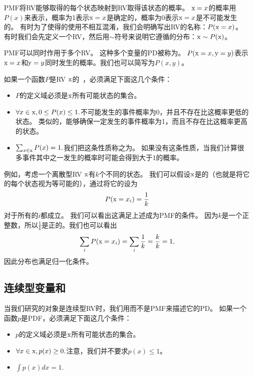 
\gls{PMF}将\gls{RV}能够取得的每个状态映射到\gls{RV}取得该状态的概率。
$\mathrm{x} = x$的概率用$P(x)$来表示，概率为1表示$\mathrm{x} = x$是确定的，概率为0表示$\mathrm{x}=x$是不可能发生的。
有时为了使得的使用不相互混淆，我们会明确写出\gls{RV}的名称：$P(\mathrm{x} = x)$。
有时我们会先定义一个\gls{RV}，然后用$\sim$符号来说明它遵循的分布：$\mathrm{x}\sim P(\mathrm{x})$。

\gls{PMF}可以同时作用于多个\gls{RV}。
这种多个变量的\gls{PD}被称为。
$P(\mathrm{x} = x, \mathrm{y} = y)$表示$\mathrm{x} = x$和$\mathrm{y} = y$同时发生的概率。我们也可以简写为$P(x, y)$。

如果一个函数$P$是\gls{RV} $\mathrm{x}$的~，必须满足下面这几个条件：
\begin{itemize}
\item $P$的定义域必须是$\mathrm{x}$所有可能状态的集合。

\item $\forall x \in \mathrm{x}, 0\le P(x)\le 1.$不可能发生的事件概率为0，并且不存在比这概率更低的状态。
类似的，能够确保一定发生的事件概率为1，而且不存在比这概率更高的状态。

\item $\sum_{x \in \mathrm{x}} P(x) = 1.$我们把这条性质称之为。
如果没有这条性质，当我们计算很多事件其中之一发生的概率时可能会得到大于1的概率。
\end{itemize}

例如，考虑一个离散型\gls{RV} $\mathrm{x}$有$k$个不同的状态。
我们可以假设$\mathrm{x}$是的（也就是将它的每个状态视为等可能的），通过将它的设为
\begin{equation}
P(\mathrm{x} = x_i) = \frac{1}{k}
\end{equation}
对于所有的$i$都成立。
我们可以看出这满足上述成为\gls{PMF}的条件。
因为$k$是一个正整数，所以$\frac{1}{k}$是正的。我们也可以看出
\begin{equation}
\sum_i P(\mathrm{x} = x_i) = \sum_i \frac{1}{k} = \frac{k}{k} = 1,
\end{equation}
因此分布也满足归一化条件。


\subsection{连续型变量和}
\label{sec:continuous_variables_and_probability_density_functions}

当我们研究的对象是连续型\gls{RV}时，我们用而不是\gls{PMF}来描述它的\gls{PD}。
如果一个函数$p$是\gls{PDF}，必须满足下面这几个条件：
\begin{itemize}
\item $p$的定义域必须是$\mathrm{x}$所有可能状态的集合。

\item $\forall x \in \mathrm{x}, p(x)\ge 0.$注意，我们并不要求$p(x)\le 1$。

\item $\int p(x) dx = 1.$
\end{itemize}

